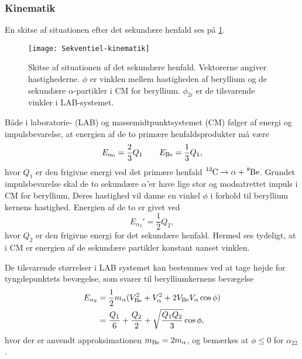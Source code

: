 \subsubsection{Kinematik}
\label{sec:sekv-kinematik}

En skitse af situationen efter det sekundære henfald ses på \cref{fig:secundary}.
\begin{figure}[h]
  \centering
  \texttt{[image: Sekventiel-kinematik]}
  \caption{Skitse af situationen af det sekundære henfald. Vektorerne angiver hastighederne. $\phi$ er
    vinklen mellem hastigheden af beryllium og de sekundære $\alpha$-partikler i CM for beryllium. $\phi_{2i}$ er
    de tilsvarende vinkler i LAB-systemet.}
  \label{fig:secundary}
\end{figure}

Både i laboratorie- (LAB) og massemidtpunktsystemet (CM) følger af energi og impulsbevarelse,
at energien af de to primære henfaldsprodukter må være
\begin{equation}
  \label{eq:Ealpha0}
  E_{\alpha_{0}} = \frac{2}{3} Q_{1} \qquad E_{\ce{Be}} = \frac{1}{3} Q_{1},
\end{equation}
hvor $Q_{1}$ er den frigivne energi ved det primære henfald $\Carb \rightarrow \alpha + \Be$. Grundet
impulsbevarelse skal de to sekundære $\alpha$'er have lige stor og modsatrettet impuls i CM for
beryllium, Deres hastighed vil danne en vinkel $\phi$ i forhold til beryllium kernens
hastighed. Energien af de to er givet ved
\begin{equation}
  \label{eq:Ealpha2}
  E_{\alpha_{2}}' = \frac{1}{2} Q_{2},
\end{equation}
hvor $Q_{2}$ er den frigivne energi for det sekundære henfald. Hermed ses tydeligt, at i CM er
energien af de sekundære partikler konstant uanset vinklen.

De tilsvarende størrelser i LAB systemet kan bestemmes ved at tage højde for tyngdepunktets
bevægelse, som svarer til berylliumkernens bevægelse
\begin{align}
  E_{\alpha_{2}} %
  &= \frac{1}{2}m_{\alpha} (V_{\ce{Be}}^{2} + V_{\alpha}^{2} + 2V_{\ce{Be}}V_{\alpha} \cos \phi) \notag \\
  &= \frac{Q_{1}}{6} + \frac{Q_{2}}{2} + \sqrt{\frac{Q_{1}Q_{2}}{3}} \cos \phi,           
  \label{eq:E2LAB} 
\end{align}
hvor der er anvendt approksimationen $m_{\ce{Be}} = 2m_{\alpha}$, og bemærkes at $\phi \leq 0$ for $\alpha_{22}$. 

